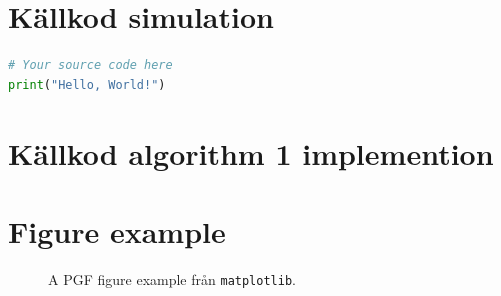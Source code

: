 \documentclass[a4paper]{article}
\begin{document}
\section{Källkod simulation}
\label{sec:source_code}
\begin{lstlisting}[language=Python, caption=Python example]
# Your source code here
print("Hello, World!")
\end{lstlisting}

\section{Källkod algorithm 1 implemention}
\label{app:source_code2}


\section{Figure example}
\begin{figure}[h]
    \begin{center}
        
    \end{center}
    \caption{A PGF figure example från \texttt{matplotlib}.}
\end{figure}
\end{document}
